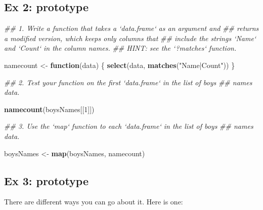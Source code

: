 \documentclass[]{book}
\newenvironment{Shaded}{\begin{snugshade}}{\end{snugshade}}
\newcommand{\CommentTok}[1]{\textcolor[rgb]{0.56,0.35,0.01}{\textit{#1}}}
\newcommand{\ControlFlowTok}[1]{\textcolor[rgb]{0.13,0.29,0.53}{\textbf{#1}}}
\newcommand{\DecValTok}[1]{\textcolor[rgb]{0.00,0.00,0.81}{#1}}
\newcommand{\KeywordTok}[1]{\textcolor[rgb]{0.13,0.29,0.53}{\textbf{#1}}}
\newcommand{\NormalTok}[1]{#1}
\newcommand{\StringTok}[1]{\textcolor[rgb]{0.31,0.60,0.02}{#1}}
\begin{document}
\hypertarget{ex-2-prototype-2}{%
\subsection{Ex 2: prototype}\label{ex-2-prototype-2}}

\begin{Shaded}
\begin{Highlighting}[]
  \CommentTok{## 1. Write a function that takes a `data.frame` as an argument and}
  \CommentTok{##   returns a modified version, which keeps only columns that}
  \CommentTok{##   include the strings `Name` and `Count` in the column names.}
  \CommentTok{##   HINT: see the `?matches` function.}

\NormalTok{  namecount <-}\StringTok{ }\ControlFlowTok{function}\NormalTok{(data) \{}
      \KeywordTok{select}\NormalTok{(data, }\KeywordTok{matches}\NormalTok{(}\StringTok{"Name|Count"}\NormalTok{))}
\NormalTok{  \}}
     
  \CommentTok{## 2. Test your function on the first `data.frame` in the list of boys}
  \CommentTok{##    names data.}

  \KeywordTok{namecount}\NormalTok{(boysNames[[}\DecValTok{1}\NormalTok{]])}
  
  \CommentTok{## 3. Use the `map` function to each `data.frame` in the list of boys}
  \CommentTok{##    names data.}

\NormalTok{  boysNames <-}\StringTok{ }\KeywordTok{map}\NormalTok{(boysNames, namecount)}
\end{Highlighting}
\end{Shaded}

\hypertarget{ex-3-prototype-3}{%
\subsection{Ex 3: prototype}\label{ex-3-prototype-3}}

There are different ways you can go about it. Here is one:
\end{document}
